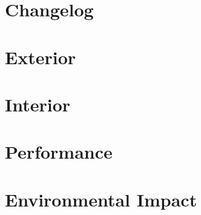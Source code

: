 \documentclass[a4paper,10pt]{report}
\title{}
\author{}
\begin{document}
\maketitle

\begin{abstract}
\end{abstract}

\chapter{Changelog}
\chapter{Exterior}
\chapter{Interior}
\chapter{Performance}
\chapter{Environmental Impact}
\end{document}
